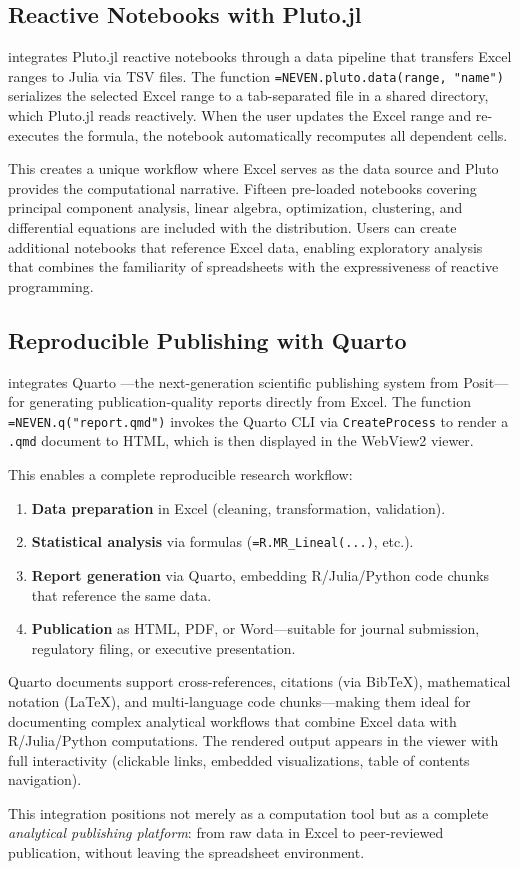 \subsection{Reactive Notebooks with Pluto.jl}

\neven{} integrates Pluto.jl \citep{Pluto2023} reactive notebooks through a data pipeline that transfers Excel ranges to Julia via TSV files. The function \texttt{=NEVEN.pluto.data(range, "name")} serializes the selected Excel range to a tab-separated file in a shared directory, which Pluto.jl reads reactively. When the user updates the Excel range and re-executes the formula, the notebook automatically recomputes all dependent cells.

This creates a unique workflow where Excel serves as the data source and Pluto provides the computational narrative. Fifteen pre-loaded notebooks covering principal component analysis, linear algebra, optimization, clustering, and differential equations are included with the distribution. Users can create additional notebooks that reference Excel data, enabling exploratory analysis that combines the familiarity of spreadsheets with the expressiveness of reactive programming.

\subsection{Reproducible Publishing with Quarto}
\label{subsec:quarto}

\neven{} integrates Quarto \citep{Quarto2023}---the next-generation scientific publishing system from Posit---for generating publication-quality reports directly from Excel. The function \texttt{=NEVEN.q("report.qmd")} invokes the Quarto CLI via \texttt{CreateProcess} to render a \texttt{.qmd} document to HTML, which is then displayed in the WebView2 viewer.

This enables a complete reproducible research workflow:
\begin{enumerate}
    \item \textbf{Data preparation} in Excel (cleaning, transformation, validation).
    \item \textbf{Statistical analysis} via \neven{} formulas (\texttt{=R.MR\_Lineal(...)}, etc.).
    \item \textbf{Report generation} via Quarto, embedding R/Julia/Python code chunks that reference the same data.
    \item \textbf{Publication} as HTML, PDF, or Word---suitable for journal submission, regulatory filing, or executive presentation.
\end{enumerate}

Quarto documents support cross-references, citations (via BibTeX), mathematical notation (LaTeX), and multi-language code chunks---making them ideal for documenting complex analytical workflows that combine Excel data with R/Julia/Python computations. The rendered output appears in the \neven{} viewer with full interactivity (clickable links, embedded visualizations, table of contents navigation).

This integration positions \neven{} not merely as a computation tool but as a complete \emph{analytical publishing platform}: from raw data in Excel to peer-reviewed publication, without leaving the spreadsheet environment.
